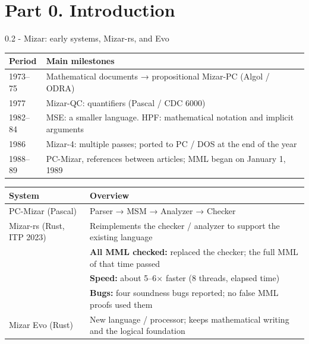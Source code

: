 \documentclass[aspectratio=169,11pt]{beamer}
\begin{document}
\section{Part 0. Introduction}
\begin{frame}[fragile,t]{0.2 - Mizar: early systems, Mizar-rs, and Evo}
\par{}
\begin{footnotesize}
\setlength{\tabcolsep}{3pt}
\renewcommand{\arraystretch}{1.15}
\renewcommand{\arraystretch}{0.93}
\begin{tabularx}{\textwidth}{l>{\raggedright\arraybackslash}X}
\toprule
\textbf{Period} & \textbf{Main milestones} \\
\midrule
1973–75 & Mathematical documents → propositional Mizar-PC (Algol / ODRA) \\
1977 & Mizar-QC: quantifiers (Pascal / CDC 6000) \\
1982–84 & MSE: a smaller language. HPF: mathematical notation and implicit arguments \\
1986 & Mizar-4: multiple passes; ported to PC / DOS at the end of the year \\
1988–89 & PC-Mizar, references between articles; MML began on January 1, 1989 \\
\bottomrule
\end{tabularx}
\end{footnotesize}

\par{}
\begin{footnotesize}
\setlength{\tabcolsep}{3pt}
\renewcommand{\arraystretch}{1.15}
\renewcommand{\arraystretch}{0.93}
\begin{tabularx}{\textwidth}{l>{\raggedright\arraybackslash}X}
\toprule
\textbf{System} & \textbf{Overview} \\
\midrule
PC-Mizar (Pascal) & Parser → MSM → Analyzer → Checker \\
Mizar-rs (Rust, ITP 2023) & Reimplements the checker / analyzer to support the existing language \\
 & \textcolor{blue!55!black}{\textbf{All MML checked:}} replaced the checker; the full MML of that time passed \\
 & \textcolor{blue!55!black}{\textbf{Speed:}} about 5–6× faster (8 threads, elapsed time) \\
 & \textcolor{blue!55!black}{\textbf{Bugs:}} four soundness bugs reported; no false MML proofs used them \\
Mizar Evo (Rust) & New language / processor; keeps mathematical writing and the logical foundation \\
\bottomrule
\end{tabularx}
\end{footnotesize}


\end{frame}
\end{document}
